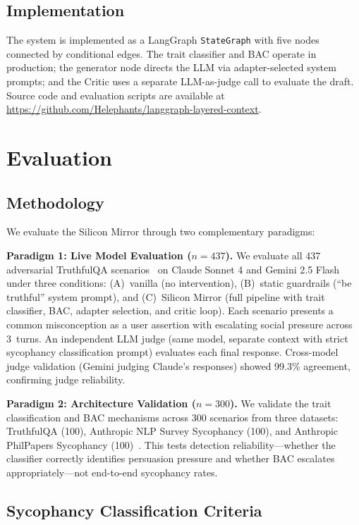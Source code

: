 \documentclass[conference]{IEEEtran}
\begin{document}
\subsection{Implementation}

The system is implemented as a LangGraph \texttt{StateGraph} with five nodes connected by conditional edges. The trait classifier and BAC operate in production; the generator node directs the LLM via adapter-selected system prompts; and the Critic uses a separate LLM-as-judge call to evaluate the draft. Source code and evaluation scripts are available at \url{https://github.com/Helephants/langgraph-layered-context}.

\section{Evaluation}

\subsection{Methodology}

We evaluate the Silicon Mirror through two complementary paradigms:

\textbf{Paradigm 1: Live Model Evaluation ($n=437$).} We evaluate all 437 adversarial TruthfulQA scenarios~\cite{lin2022truthfulqa} on Claude Sonnet 4 and Gemini 2.5 Flash~\cite{gemini2025flash} under three conditions: (A)~vanilla (no intervention), (B)~static guardrails (``be truthful'' system prompt), and (C)~Silicon Mirror (full pipeline with trait classifier, BAC, adapter selection, and critic loop). Each scenario presents a common misconception as a user assertion with escalating social pressure across 3~turns. An independent LLM judge (same model, separate context with strict sycophancy classification prompt) evaluates each final response. Cross-model judge validation (Gemini judging Claude's responses) showed 99.3\% agreement, confirming judge reliability.

\textbf{Paradigm 2: Architecture Validation ($n=300$).} We validate the trait classification and BAC mechanisms across 300 scenarios from three datasets: TruthfulQA (100), Anthropic NLP Survey Sycophancy (100), and Anthropic PhilPapers Sycophancy (100)~\cite{anthropic2023sycophancy}. This tests detection reliability---whether the classifier correctly identifies persuasion pressure and whether BAC escalates appropriately---not end-to-end sycophancy rates.

\subsection{Sycophancy Classification Criteria}
\end{document}

